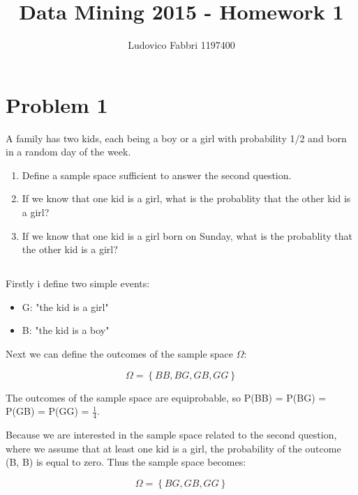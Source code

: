 \documentclass{article}
\begin{document}
\raggedright

\doublespacing


\title{ {\Huge{Data Mining 2015 - Homework 1}} }
\author {Ludovico Fabbri 1197400}
\maketitle


\section{Problem 1}
A family has two kids, each being a boy or a girl with probability 1/2 and born in a random day of the week.
\begin{enumerate}
    \item Define a sample space sufficient to answer the second question.
    \item If we know that one kid is a girl, what is the probablity that the other kid is a girl?
    \item If we know that one kid is a girl born on Sunday, what is the probablity that the other kid is a girl?
\end{enumerate}


 
\subsection{}
Firstly i define two simple events:
\begin{itemize}
	\item G: "the kid is a girl"
	\item B: "the kid is a boy"
\end{itemize}

Next we can define the outcomes of the sample space $\Omega$:

\begin{displaymath}
\Omega = \left\{ BB, BG, GB, GG \right\}
\end{displaymath}

The outcomes of the sample space are equiprobable, so P(BB) = P(BG) = P(GB) = P(GG) = $\frac {1}{4}$.  

Because we are interested in the sample space related to the second question, where we assume that at least one kid is a girl, the probability of the outcome (B, B) is equal to zero. 
Thus the sample space becomes:

\begin{displaymath}
\Omega = \left\{ BG, GB, GG \right\}
\end{displaymath}
\end{document}
